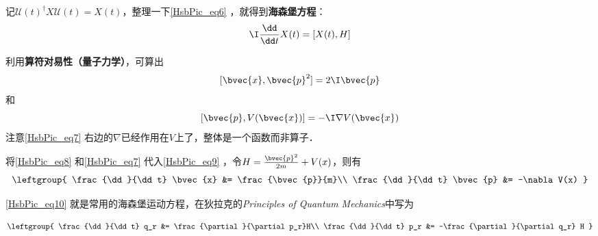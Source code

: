记$\mathcal{U}(t)^\dagger X \mathcal{U}(t)=X(t)$，整理一下\autoref{HsbPic_eq6} ，就得到\textbf{海森堡方程}：
\begin{equation}\label{HsbPic_eq9}
\I\frac{\dd}{\dd t}X(t) = [X(t), H]
\end{equation}


利用\textbf{算符对易性（量子力学）}，可算出
\begin{equation}\label{HsbPic_eq8}
    [\bvec{x}, \bvec{p}^2] = 2\I \bvec{p}
\end{equation}
和
\begin{equation}\label{HsbPic_eq7}
[\bvec{p}, V(\bvec{x})] = -\I\nabla V(\bvec{x})
\end{equation}
注意\autoref{HsbPic_eq7} 右边的$\nabla$已经作用在$V$上了，整体是一个函数而非算子．

将\autoref{HsbPic_eq8} 和\autoref{HsbPic_eq7} 代入\autoref{HsbPic_eq9} ，令$H=\frac{\bvec{p}^2}{2m}+V(x)$，则有
\begin{equation}\label{HsbPic_eq10}
\leftgroup{
    \frac{\dd}{\dd t} \bvec{x} &= \frac{\bvec{p}}{m}\\
    \frac{\dd}{\dd t} \bvec{p} &= -\nabla V(x)
}
\end{equation}


\autoref{HsbPic_eq10} 就是常用的海森堡运动方程，在狄拉克的\textsl{Principles of Quantum Mechanics}中写为

\begin{equation}\label{HsbPic_eq11}
\leftgroup{
    \frac{\dd}{\dd t} q_r &= \frac{\partial}{\partial p_r}H\\
    \frac{\dd}{\dd t} p_r &= -\frac{\partial}{\partial q_r} H
}
\end{equation}







